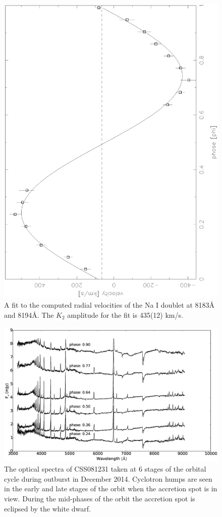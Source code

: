 \documentclass[a4paper,fleqn,usenatbib]{mnras}
\begin{document}
\begin{figure}
\centering
\includegraphics[height=\columnwidth, angle=270]{images/NaIrvfit.eps}
\caption[Caption for RVs]{A fit to the computed radial velocities of the Na I doublet at 8183\AA~ and 8194\AA. The $K_2$ amplitude for the fit is 435(12) km/s.     }
\label{fig:rv-fit}
\end{figure}

\begin{figure}
\centering
\includegraphics[width=\textwidth]{images/CSS081231_spectra.eps}
\caption[Caption for spectra]{The optical spectra of CSS081231 taken at 6 stages of the orbital cycle during outburst in December 2014. Cyclotron humps are seen in the early and late stages of the orbit when the accretion spot is in view. During the mid-phases of the orbit the accretion spot is eclipsed by the white dwarf. }
\label{fig:spectra-outpurst}
\end{figure}
\end{document}
